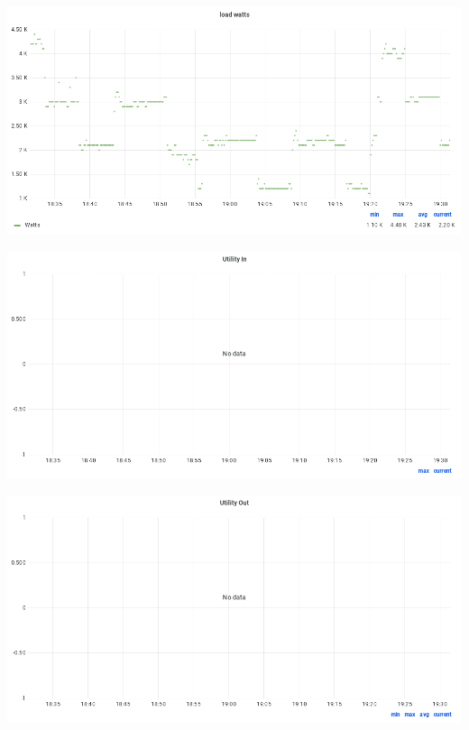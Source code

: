 \documentclass{article}
\begin{document}
\begin{center}
\par
\vspace{0.5cm}
\par
\vspace{0.5cm}
\includegraphics[width=\textwidth]{image36}
\par
\vspace{0.5cm}
\par
\vspace{0.5cm}
\includegraphics[width=\textwidth]{image14}
\par
\vspace{0.5cm}
\par
\vspace{0.5cm}
\includegraphics[width=\textwidth]{image32}
\par
\vspace{0.5cm}


\end{center}
\end{document}
